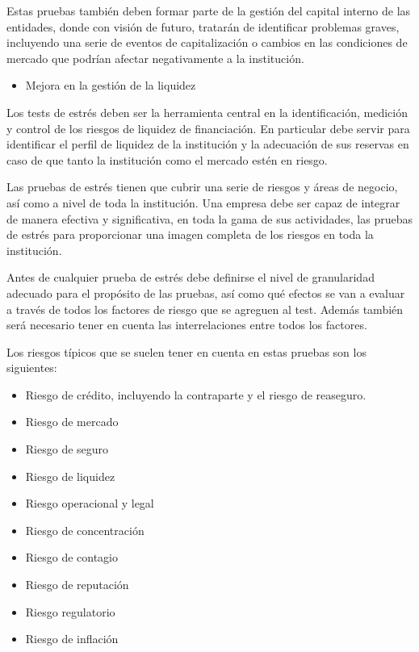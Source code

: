 \documentclass[
  12pt,
]{krantz}
\providecommand{\tightlist}{%
  \setlength{\itemsep}{0pt}\setlength{\parskip}{0pt}}
\begin{document}
Estas pruebas también deben formar parte de la gestión del capital interno de las entidades, donde con visión de futuro, tratarán de identificar problemas graves, incluyendo una serie de eventos de capitalización o cambios en las condiciones de mercado que podrían afectar negativamente a la institución.

\begin{itemize}
\tightlist
\item
  Mejora en la gestión de la liquidez
\end{itemize}

Los tests de estrés deben ser la herramienta central en la identificación, medición y control de los riesgos de liquidez de financiación. En particular debe servir para identificar el perfil de liquidez de la institución y la adecuación de sus reservas en caso de que tanto la institución como el mercado estén en riesgo.

Las pruebas de estrés tienen que cubrir una serie de riesgos y áreas de negocio, así como a nivel de toda la institución. Una empresa debe ser capaz de integrar de manera efectiva y significativa, en toda la gama de sus actividades, las pruebas de estrés para proporcionar una imagen completa de los riesgos en toda la institución.

Antes de cualquier prueba de estrés debe definirse el nivel de granularidad adecuado para el propósito de las pruebas, así como qué efectos se van a evaluar a través de todos los factores de riesgo que se agreguen al test. Además también será necesario tener en cuenta las interrelaciones entre todos los factores.

Los riesgos típicos que se suelen tener en cuenta en estas pruebas son los siguientes:

\begin{itemize}
\tightlist
\item
  Riesgo de crédito, incluyendo la contraparte y el riesgo de reaseguro.
\item
  Riesgo de mercado
\item
  Riesgo de seguro
\item
  Riesgo de liquidez
\item
  Riesgo operacional y legal
\item
  Riesgo de concentración
\item
  Riesgo de contagio
\item
  Riesgo de reputación
\item
  Riesgo regulatorio
\item
  Riesgo de inflación
\end{itemize}
\end{document}

